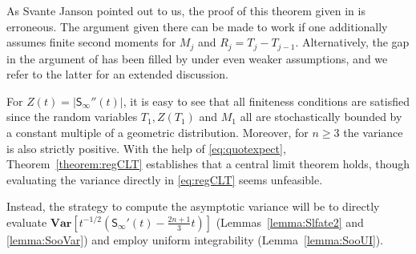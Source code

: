 \documentclass[a4paper,11pt,reqno]{amsart}
\newcommand{\bVar}{\mathbf{Var}}
\newcommand{\Soo}{\mathsf{S}_\infty}
\theoremstyle{definition}
\begin{document}
As Svante Janson pointed out to us, the proof of this theorem given in \cite{Serfozo09} is erroneous. The argument given there can be made to work if one additionally assumes finite second moments for $M_j$ and $R_j = T_j - T_{j-1}$. Alternatively, the gap in the argument of \cite{Serfozo09} has been filled by \cite{Jan23} under even weaker assumptions, and we refer to the latter for an extended discussion. 

For $Z(t)=|\Soo''(t)|$, it is easy to see that all finiteness conditions are satisfied since the random variables $T_1, Z(T_1)$ and $M_1$ all are stochastically bounded by a constant multiple of a geometric distribution. Moreover, for $n\geq 3$ the variance is also strictly positive. With the help of \eqref{eq:quotexpect}, Theorem~\ref{theorem:regCLT} establishes that a central limit theorem holds, though evaluating the variance directly in \eqref{eq:regCLT} seems unfeasible. 

Instead, the strategy to compute the asymptotic variance will be to directly evaluate $\bVar[t^{-1/2}(\Soo'(t)-\frac{2n+1}{3}t)]$ (Lemmas~\ref{lemma:Slfate2} and \ref{lemma:SooVar}) and employ uniform integrability (Lemma~\ref{lemma:SooUI}). 
\end{document}
